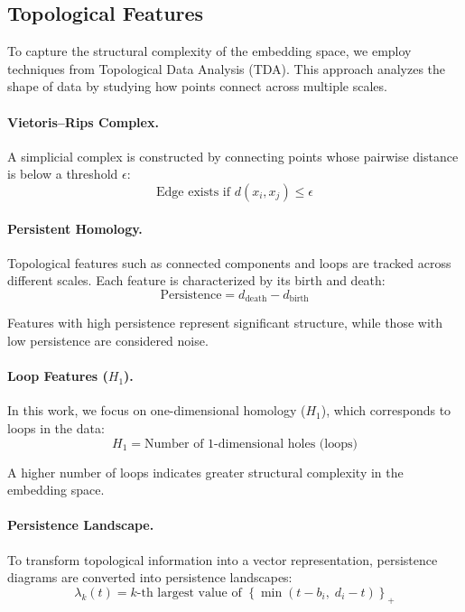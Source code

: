 \subsection{Topological Features}

To capture the structural complexity of the embedding space, we employ techniques from
Topological Data Analysis (TDA). This approach analyzes the shape of data by studying how
points connect across multiple scales.

\paragraph{Vietoris--Rips Complex.}
A simplicial complex is constructed by connecting points whose pairwise distance is below a
threshold $\epsilon$:
\begin{equation}
\text{Edge exists if } d(x_i, x_j) \leq \epsilon
\end{equation}

\paragraph{Persistent Homology.}
Topological features such as connected components and loops are tracked across different
scales. Each feature is characterized by its birth and death:
\begin{equation}
\text{Persistence} = d_{\text{death}} - d_{\text{birth}}
\end{equation}

Features with high persistence represent significant structure, while those with low persistence
are considered noise.

\paragraph{Loop Features ($H_1$).}
In this work, we focus on one-dimensional homology ($H_1$), which corresponds to loops in the
data:
\begin{equation}
H_1 = \text{Number of 1-dimensional holes (loops)}
\end{equation}

A higher number of loops indicates greater structural complexity in the embedding space.

\paragraph{Persistence Landscape.}
To transform topological information into a vector representation, persistence diagrams are
converted into persistence landscapes:
\begin{equation}
\lambda_k(t) = k\text{-th largest value of } \left\{ \min(t - b_i,\; d_i - t) \right\}_+
\end{equation}


